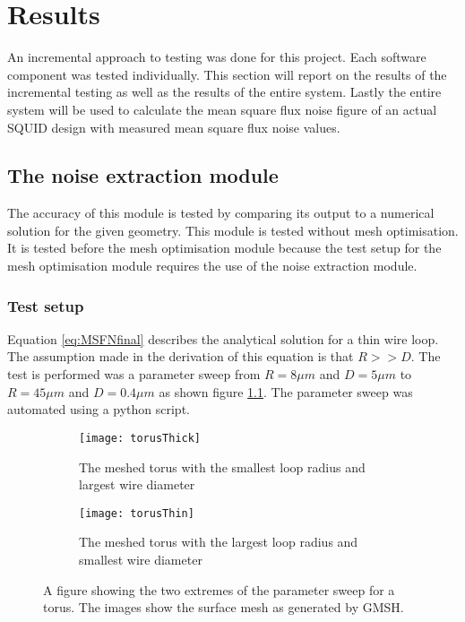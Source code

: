 \graphicspath{{results/fig/}}

\chapter{Results}
\label{chap:results}
An incremental approach to testing was done for this project. Each software component was tested individually. This section will report on the results of the incremental testing as well as the results of the entire system. Lastly the entire system will be used to calculate the mean square flux noise figure of an actual SQUID design with measured mean square flux noise values.

\section{The noise extraction module}
The accuracy of this module is tested by comparing its output to a numerical solution for the given geometry. This module is tested without mesh optimisation. It is tested before the mesh optimisation module because the test setup for the mesh optimisation module requires the use of the noise extraction module.
\subsection{Test setup}

Equation \ref{eq:MSFNfinal} describes the analytical solution for a thin wire loop. The assumption made in the derivation of this equation is that $R >> D$. The test is performed was a parameter sweep from $R = \si{8}{\mu m}$ and $D = \si{5}{\mu m}$ to $R = \si{45}{\mu m}$ and $D = \si{0.4}{\mu m}$ as shown figure \ref{fig:meshedTorus}. The parameter sweep was automated using a python script.

\begin{figure}[h]
    \centering
    \begin{subfigure}[b]{0.45\textwidth}
        \centering
        \texttt{[image: torusThick]}
        \caption{The meshed torus with the smallest loop radius and largest wire diameter}
    \end{subfigure}
    \hfill
    \begin{subfigure}[b]{0.45\textwidth}
        \centering
        \texttt{[image: torusThin]}
        \caption{The meshed torus with the largest loop radius and smallest wire diameter}
    \end{subfigure}
    \caption{A figure showing the two extremes of the parameter sweep for a torus. The images show the surface mesh as generated by GMSH.}
    \label{fig:meshedTorus}
\end{figure}
